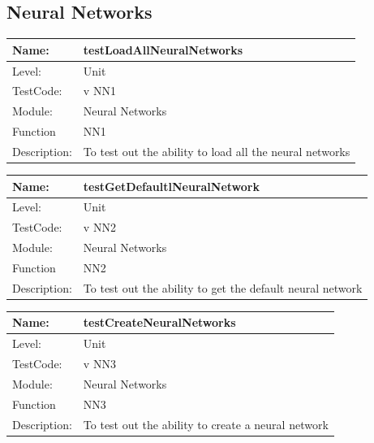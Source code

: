 \documentclass[12pt]{article}
\begin{document}
\subsection{Neural Networks}

\begin{center}
\begin{tabular}{|l|p{12cm}|}
\hline

 Name: & testLoadAllNeuralNetworks \\
 \hline
Level: & Unit \\
\hline
TestCode: & v NN1 \\
\hline
Module:& Neural Networks \\
\hline
Function & NN1 \\
\hline
Description: & To test out the ability to load all the neural networks  \\
\hline
\end{tabular}
\end{center}

\begin{center}
\begin{tabular}{|l|p{12cm}|}
\hline

 Name: & testGetDefaultlNeuralNetwork \\
 \hline
Level: & Unit \\
\hline
TestCode: & v NN2 \\
\hline
Module:& Neural Networks \\
\hline
Function & NN2 \\
\hline
Description: & To test out the ability to get the default neural network  \\
\hline
\end{tabular}
\end{center}
\begin{center}
\begin{tabular}{|l|p{12cm}|}
\hline

 Name: & testCreateNeuralNetworks \\
 \hline
Level: & Unit \\
\hline
TestCode: & v NN3 \\
\hline
Module:& Neural Networks \\
\hline
Function & NN3 \\
\hline
Description: & To test out the ability to create a neural network  \\
\hline
\end{tabular}
\end{center}
\end{document}
